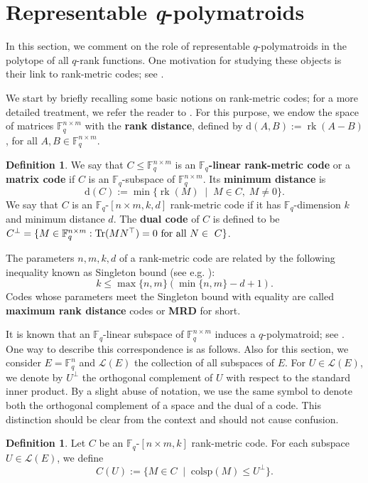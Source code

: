 \documentclass[a4paper,11pt,reqno]{amsart}
\theoremstyle{definition}
\newtheorem{definition}[theorem]{{{Definition}}}
\newcommand{\mL}{\mathcal{L}}
\newcommand{\F}{\mathbb F}
\DeclareMathOperator{\rk}{rk}
\begin{document}
{%

\section{Representable \emph{q}-polymatroids}\label{sec: rep_q_polymats}

In this section, we comment on the role of representable $q$-polymatroids in the polytope of all $q$-rank functions. One motivation for studying these objects is their link to rank-metric codes; see \cite{jurrius2018defining, gorla2019rank, shiromoto2019codes, gluesing2022q}. 

We start by briefly recalling some basic notions on rank-metric codes; for a more detailed treatment, we refer the reader to \cite{de78,gabidulin1985theory,gorla2021rank}.
For this purpose, we endow the space of matrices $\F_{q}^{n \times m}$ with the \textbf{rank distance}, defined by $\mathrm{d}(A,B):=\rk(A-B)$, for all $A,B\in\F_{q}^{n \times m}$.

\begin{definition}
 We say that $C \leq \F_q^{n \times m}$ is an {\bf $\F_q$-linear rank-metric code} or a {\bf matrix code} if $C$ is an $\F_q$-subspace of $\F_{q}^{n \times m}$. Its \textbf{minimum distance} is
 $$\mathrm{d}(C):=\min\{\rk(M) \;\mid\; M \in C, \; M \neq 0\}.$$ We say that $C$ is an $\F_q$-$[n \times m, k,d]$ rank-metric code if it has $\F_q$-dimension $k$ and minimum distance $d$. 
The \textbf{dual code} of $C$ is defined to be $C^{\perp}=\{M\in\F_q^{n\times m}: \mathrm{Tr}(MN^\top)=0 \textnormal{ for all } N\in~C\}$.
\end{definition} 

The parameters $n,m,k,d$ of a rank-metric code are related by the following inequality known as Singleton bound (see e.g. \cite{de78}):
$$k \leq \max\{n,m\}(\min\{n,m\}-d+1).$$
Codes whose parameters meet the Singleton bound with equality are called \textbf{maximum rank distance} codes or \textbf{MRD} for short.

It is known that an $\F_q$-linear subspace of $\F_q^{n\times m}$ induces a $q$-polymatroid; see \cite{gorla2019rank, shiromoto2019codes}. One way to describe this correspondence is as follows. Also for this section, we consider $E=\F_q^n$ and $\mL(E)$ the collection of all subspaces of $E$. For $U\in\mL(E)$, we denote by $U^\perp$ the orthogonal complement of $U$ with respect to the standard inner product. By a slight abuse of notation, we use the same symbol to denote both the orthogonal complement of a space and the dual of a code. This distinction should be clear from the context and should not cause confusion.
\begin{definition}\label{def:codepoly}
Let $C$ be an $\F_q$-$[n\times m,k]$ rank-metric code.
For each subspace $U\in\mL(E)$, we define
$$C(U):=\{M \in C \;\mid\; \mathrm{colsp}(M) \leq U^\perp\}.$$


\end{definition}}
\end{document}
